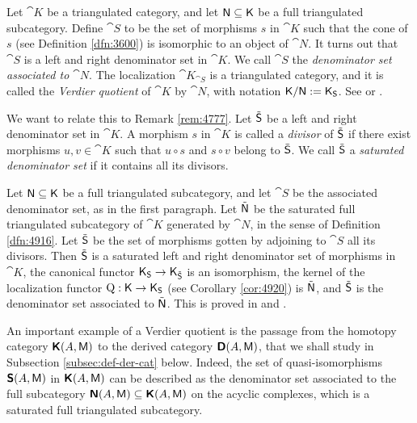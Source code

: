 \begin{rem} \label{rem:4220}
Let $\cat{K}$ be a triangulated category, and let 
$\operatorname{\mathsf{N}} \subseteq \operatorname{\mathsf{K}}$ be a full triangulated subcategory. Define 
$\cat{S}$ to be the set of morphisms $s$ in $\cat{K}$ such that the 
cone of $s$ (see Definition \ref{dfn:3600}) is isomorphic to an object of 
$\cat{N}$.  It turns out that $\cat{S}$ is a left and right denominator set in 
$\cat{K}$. We call $\cat{S}$ the {\em denominator set associated to $\cat{N}$}. 
The localization $\cat{K}_{\cat{S}}$ is a triangulated 
category, and it is called the {\em Verdier quotient}%
of $\cat{K}$ by $\cat{N}$, with notation 
$\mathrm{\mathsf{K}} / \mathrm{\mathsf{N}} :=  \operatorname{\mathsf{K}}_{\operatorname{\mathsf{S}}}$. 
See \cite[Chapter 2]{Ver} or \cite[Section 1.6]{KaSc1}. 

We want to relate this to Remark \ref{rem:4777}. 
Let $\tilde{\operatorname{\mathsf{S}}}$ be a left and right denominator set in $\cat{K}$.
A morphism $s$ in $\cat{K}$ is called a {\em divisor} of $\tilde{\operatorname{\mathsf{S}}}$ 
if there exist morphisms $u, v \in \cat{K}$ such that 
$u \circ s$ and $s \circ v$ belong to $\tilde{\operatorname{\mathsf{S}}}$.
We call $\tilde{\operatorname{\mathsf{S}}}$ a {\em saturated denominator set} if 
it contains all its divisors.

Let $\operatorname{\mathsf{N}} \subseteq \operatorname{\mathsf{K}}$ be a full triangulated subcategory, and let 
$\cat{S}$ be the associated denominator set, as in the first 
paragraph. Let  $\tilde{\operatorname{\mathsf{N}}}$ be the saturated 
full triangulated subcategory of $\cat{K}$ generated by $\cat{N}$, in the 
sense of Definition \ref{dfn:4916}. Let $\tilde{\operatorname{\mathsf{S}}}$ be the set of morphisms
gotten by adjoining to $\cat{S}$ all its divisors. 
Then $\tilde{\operatorname{\mathsf{S}}}$ is a saturated left and right denominator set of morphisms 
in $\cat{K}$, the canonical functor 
$\operatorname{\mathsf{K}}_{\operatorname{\mathsf{S}}} \to \operatorname{\mathsf{K}}_{\tilde{\operatorname{\mathsf{S}}}}$
is an isomorphism, the kernel of the localization functor 
$\operatorname{Q} : \operatorname{\mathsf{K}} \to \operatorname{\mathsf{K}}_{\operatorname{\mathsf{S}}}$
(see Corollary \ref{cor:4920}) is $\tilde{\operatorname{\mathsf{N}}}$,
and $\tilde{\operatorname{\mathsf{S}}}$ is the denominator set associated to $\tilde{\operatorname{\mathsf{N}}}$.
This is proved in \cite[Chapter 2]{Ver} and \cite[Proposition 7.1.20]{KaSc2}.

An important example of a Verdier quotient is the passage from 
the homotopy category $\boldsymbol{\mathsf{K}}(A, \operatorname{\mathsf{M}})$ to the derived category 
$\boldsymbol{\mathsf{D}}(A, \operatorname{\mathsf{M}})$, that we shall study in Subsection 
\ref{subsec:def-der-cat} below. Indeed, the set of quasi-isomorphisms 
$\boldsymbol{\mathsf{S}}(A, \operatorname{\mathsf{M}})$ in $\boldsymbol{\mathsf{K}}(A, \operatorname{\mathsf{M}})$
can be described as the denominator set associated to the 
full subcategory $\boldsymbol{\mathsf{N}}(A, \operatorname{\mathsf{M}}) \subseteq \boldsymbol{\mathsf{K}}(A, \operatorname{\mathsf{M}})$ on the 
acyclic complexes, which is a saturated full triangulated subcategory. 
\end{rem}



